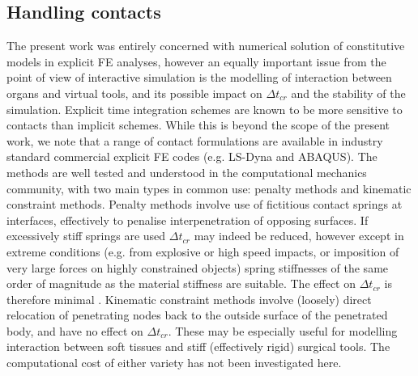 	
	\subsection{Handling contacts}
The present work was entirely concerned with numerical solution of constitutive models in explicit FE analyses, however an equally important issue from the point of view of interactive simulation is the modelling of interaction between organs and virtual tools, and its possible impact on $ \Delta t_{cr} $ and the stability of the simulation. Explicit time integration schemes are known to be more sensitive to contacts than implicit schemes. While this is beyond the scope of the present work, we note that a range of contact formulations are available in industry standard commercial explicit FE codes (e.g. LS-Dyna and ABAQUS). The methods are well tested and understood in the computational mechanics community, with two main types in common use: penalty methods and kinematic constraint methods. Penalty methods involve use of fictitious contact springs at interfaces, effectively to penalise interpenetration of opposing surfaces. If excessively stiff springs are used $ \Delta t_{cr} $ may indeed be reduced, however except in extreme conditions (e.g. from explosive or high speed impacts, or imposition of very large forces on highly constrained objects) spring stiffnesses of the same order of magnitude as the material stiffness are suitable. The effect on $ \Delta t_{cr} $ is therefore minimal \citep{Hallquist06}. Kinematic constraint methods involve (loosely) direct relocation of penetrating nodes back to the outside surface of the penetrated body, and have no effect on $ \Delta t_{cr} $. These may be especially useful for modelling interaction between soft tissues and stiff (effectively rigid) surgical tools. The computational cost of either variety has not been investigated here. 
	
	